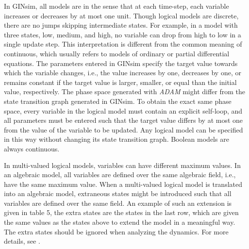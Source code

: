 \documentclass[10pt]{bmc_article}
\newcommand{\ul}{\hi}
\newenvironment{bmcformat}{\fussy\setboolean{publ}{true}}{\fussy}
\begin{document}
\begin{bmcformat}
In GINsim, all models are {\it \ul{continuous}} in the sense that at each time-step, each variable increases or decreases by at most one unit. Though logical models are discrete, there are no jumps skipping intermediate states. For example, in a model with three states, low, medium, and high, no variable can drop from high to low in a single update step. This interpretation is different from the common meaning of continuous, which usually refers to models of ordinary or partial differential equations. The parameters entered in GINsim specify the target value towards which the variable changes, i.e., the value increases by one, decreases by one, or remains constant if the target value is larger, smaller, or equal than the initial value, respectively. The phase space generated with {\it ADAM} might differ from the state transition graph generated in GINsim. To obtain the exact same phase space, every variable in the logical model must contain an explicit self-loop, and all parameters must be entered such that the target value differs by at most one from the value of the variable to be updated. Any logical model can be specified in this way without changing its state transition graph. Boolean models are always continuous.   

In multi-valued logical models, variables can have different maximum values. In an algebraic model, all variables are defined over the same algebraic field, i.e., have the same maximum value. When a multi-valued logical model is translated into an algebraic model, extraneous states might be introduced such that all variables are defined over the same field. An example of such an extension is given in table 5, the extra states are the states in the last row, which are given the same values as the states above to extend the model in a meaningful way. The extra states should be ignored when analyzing the dynamics. For more details, see \cite{Alan:Bioinf2010}.  







\end{bmcformat}
\end{document}
